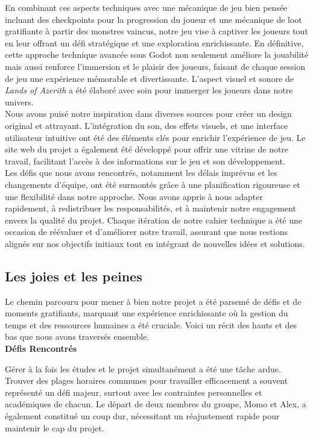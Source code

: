 En combinant ces aspects techniques avec une mécanique de jeu bien pensée incluant des checkpoints pour la progression du joueur et une mécanique de loot gratifiante
à partir des monstres vaincus, notre jeu vise à captiver les joueurs tout en leur offrant un défi stratégique et une exploration enrichissante. En définitive, cette
approche technique avancée sous Godot non seulement améliore la jouabilité mais aussi renforce l'immersion et le plaisir des joueurs, faisant de chaque session de jeu une
expérience mémorable et divertissante.
L'aspect visuel et sonore de \textit{Lands of Azerith} a été élaboré avec soin pour immerger les joueurs dans notre univers.
\\

Nous avons puisé notre inspiration dans diverses sources pour créer un design original et attrayant.
L'intégration du son, des effets visuels, et une interface utilisateur intuitive ont été des éléments clés pour enrichir l'expérience de jeu.
Le site web du projet a également été développé pour offrir une vitrine de notre travail, facilitant l'accès à des informations sur le jeu et son développement.
\\

Les défis que nous avons rencontrés, notamment les délais imprévus et les changements d'équipe, ont été surmontés grâce à une planification rigoureuse
et une flexibilité dans notre approche. Nous avons appris à nous adapter rapidement, à redistribuer les responsabilités, et à maintenir notre engagement
envers la qualité du projet. Chaque itération de notre cahier technique a été une occasion de réévaluer et d'améliorer notre travail, assurant que nous
restions alignés sur nos objectifs initiaux tout en intégrant de nouvelles idées et solutions.
\\

\subsection{Les joies et les peines}

Le chemin parcouru pour mener à bien notre projet a été parsemé de défis et de moments gratifiants, marquant une expérience enrichissante où la gestion du
temps et des ressources humaines a été cruciale. Voici un récit des hauts et des bas que nous avons traversés ensemble.
\\

\textbf{Défis Rencontrés}

Gérer à la fois les études et le projet simultanément a été une tâche ardue. Trouver des plages horaires communes pour travailler efficacement a souvent
représenté un défi majeur, surtout avec les contraintes personnelles et académiques de chacun. Le départ de deux membres du groupe, Momo et Alex,
a également constitué un coup dur, nécessitant un réajustement rapide pour maintenir le cap du projet.
\\

